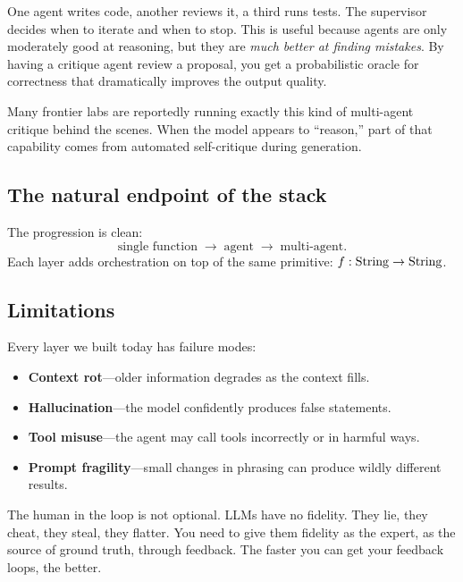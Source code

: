 One agent writes code, another reviews it, a third runs tests.  The
supervisor decides when to iterate and when to stop.  This is useful
because agents are only moderately good at reasoning, but they are
\emph{much better at finding mistakes}.  By having a critique agent
review a proposal, you get a probabilistic oracle for correctness that
dramatically improves the output quality.

\begin{remark}
  Many frontier labs are reportedly running exactly this kind of
  multi-agent critique behind the scenes.  When the model appears to
  ``reason,'' part of that capability comes from automated
  self-critique during generation.
\end{remark}

\subsection{The natural endpoint of the stack}

The progression is clean:
\[
  \text{single function} \;\to\; \text{agent} \;\to\; \text{multi-agent}.
\]
Each layer adds orchestration on top of the same primitive:
$f : \mathrm{String} \to \mathrm{String}$.

\subsection{Limitations}

Every layer we built today has failure modes:

\begin{itemize}
  \item \textbf{Context rot}---older information degrades as the context
    fills.
  \item \textbf{Hallucination}---the model confidently produces false
    statements.
  \item \textbf{Tool misuse}---the agent may call tools incorrectly or
    in harmful ways.
  \item \textbf{Prompt fragility}---small changes in phrasing can
    produce wildly different results.
\end{itemize}

\begin{keyresult}
  The human in the loop is not optional.  LLMs have no fidelity.  They
  lie, they cheat, they steal, they flatter.  You need to give them
  fidelity as the expert, as the source of ground truth, through
  feedback.  The faster you can get your feedback loops, the better.
\end{keyresult}

